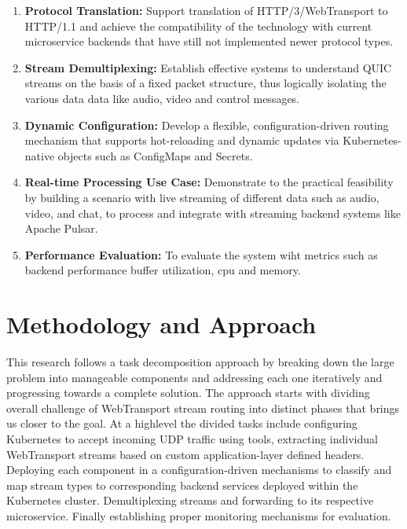 \begin{enumerate}
\item \textbf{Protocol Translation:} Support translation of HTTP/3/WebTransport to HTTP/1.1 and achieve the compatibility of the technology with current microservice backends that have still not implemented newer protocol types.

\item \textbf{Stream Demultiplexing:} Establish effective systems to understand QUIC streams on the basis of a fixed packet structure, thus logically isolating the various data data like audio, video and control messages.

\item \textbf{Dynamic Configuration:} Develop a flexible, configuration-driven routing mechanism that supports hot-reloading and dynamic updates via Kubernetes-native objects such as ConfigMaps and Secrets.

\item \textbf{Real-time Processing Use Case:} Demonstrate to the practical feasibility by building a scenario with live streaming of different data such as audio, video, and chat, to process and integrate with streaming backend systems like Apache Pulsar.

\item \textbf{Performance Evaluation:} To evaluate the system wiht metrics such as backend performance buffer utilization, cpu and memory.

\end{enumerate}

\section{Methodology and Approach}

This research follows a task decomposition approach by breaking down the large problem into manageable components and addressing each one iteratively and progressing towards a complete solution. The approach starts with dividing overall challenge of WebTransport stream routing into distinct phases that brings us closer to the goal. At a highlevel the divided tasks include configuring Kubernetes to accept incoming UDP traffic using tools, extracting individual WebTransport streams based on custom application-layer defined headers. Deploying each component in a configuration-driven mechanisms to classify and map stream types to corresponding backend services deployed within the Kubernetes cluster. Demultiplexing streams  and forwarding to its respective microservice. Finally establishing proper monitoring mechanisms for evaluation.

